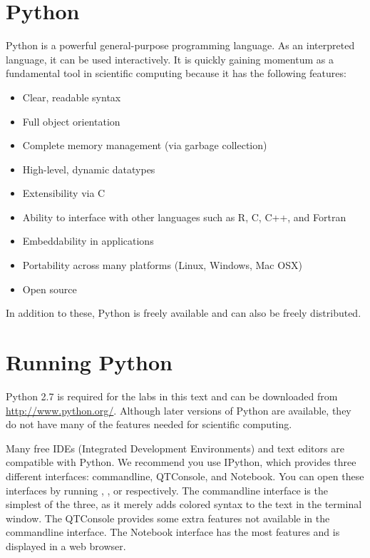 \label{lab:Essential_Python}

\section*{Python}
Python is a powerful general-purpose programming language. As an interpreted
language, it can be used interactively. 
It is quickly gaining momentum as a fundamental tool in scientific computing because it has the following features:
\begin{itemize}
\item Clear, readable syntax
\item Full object orientation
\item Complete memory management (via garbage collection)
\item High-level, dynamic datatypes
\item Extensibility via C
\item Ability to interface with other languages such as R, C, C++, and Fortran
\item Embeddability in applications
\item Portability across many platforms (Linux, Windows, Mac OSX)
\item Open source
\end{itemize}
In addition to these, Python is freely available and can also be freely distributed.

\section*{Running Python}
Python 2.7 is required for the labs in this text and can be downloaded from \url{http://www.python.org/}. Although later versions of 
Python are available, they do not have many of the features needed for scientific computing. 

Many free IDEs (Integrated Development Environments) and text editors are compatible with Python. We recommend you use IPython, which provides three different interfaces: commandline, QTConsole, and Notebook. You can open these interfaces by running , , or  respectively.
The commandline interface is the simplest of the three, as it merely adds colored syntax to the text in the terminal window.
The QTConsole provides some extra features not available in the commandline interface.
The Notebook interface has the most features and is displayed in a web browser.


